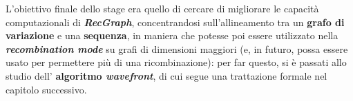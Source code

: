     \vspace{20pt}
    L'obiettivo finale dello stage era quello di cercare di migliorare le capacità computazionali di \textbf{\textit{RecGraph}}, concentrandosi sull'allineamento tra un \textbf{grafo di variazione} e una \textbf{sequenza}, in maniera che potesse poi essere utilizzato nella \textbf{\textit{recombination mode}} su grafi di dimensioni maggiori (e, in futuro, possa essere usato per permettere più di una ricombinazione): per far questo, si è passati allo studio dell' \textbf{algoritmo \textit{wavefront}}, di cui segue una trattazione formale nel capitolo successivo.